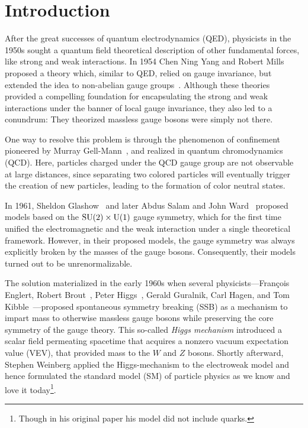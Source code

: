 
\chapter{Introduction}\label{chap:one}

After the great successes of quantum electrodynamics (\acs{QED}), physicists in the 1950s sought a quantum field theoretical description of other fundamental forces, like strong and weak interactions. In 1954 Chen Ning Yang and Robert Mills proposed a theory which, similar to \acs{QED}, relied on gauge invariance, but extended the idea to non-abelian gauge groups~\cite{Yang:1954ek}. Although these theories provided a compelling foundation for encapsulating the strong and weak interactions under the banner of local gauge invariance, they also led to a conundrum: They theorized massless gauge bosons were simply not there.

One way to resolve this problem is through the phenomenon of confinement pioneered by Murray Gell-Mann~\cite{Gell-Mann:1961omu}, and realized in quantum chromodynamics (\acs{QCD}). Here, particles charged under the \acs{QCD} gauge group are not observable at large distances, since separating two colored particles will eventually trigger the creation of new particles, leading to the formation of color neutral states.

In 1961, Sheldon Glashow~\cite{Glashow:1961tr} and later Abdus Salam and John Ward~\cite{Salam:1964ry} proposed models based on the $\mathrm{SU}(2)\times \mathrm{U}(1)$ gauge symmetry, which for the first time unified the electromagnetic and the weak interaction under a single theoretical framework. However, in their proposed models, the gauge symmetry was always explicitly broken by the masses of the gauge bosons. Consequently, their models turned out to be unrenormalizable.

The solution materialized in the early 1960s when several physicists---François Englert, Robert Brout~\cite{Englert:1964et}, Peter Higgs~\cite{Higgs:1966ev}, Gerald Guralnik, Carl Hagen, and Tom Kibble~\cite{Guralnik:1964eu}---proposed spontaneous symmetry breaking (\acs{SSB}) as a mechanism to impart mass to otherwise massless gauge bosons while preserving the core symmetry of the gauge theory. This so-called \textit{Higgs mechanism} introduced a scalar field permeating spacetime that acquires a nonzero vacuum expectation value (\acs{VEV}), that provided mass to the $W$ and $Z$ bosons. Shortly afterward, Stephen Weinberg applied the Higgs-mechanism to the electroweak model and hence formulated the standard model (\acs{SM}) of particle physics as we know and love it today\footnote{Though in his original paper his model did not include quarks.}.

